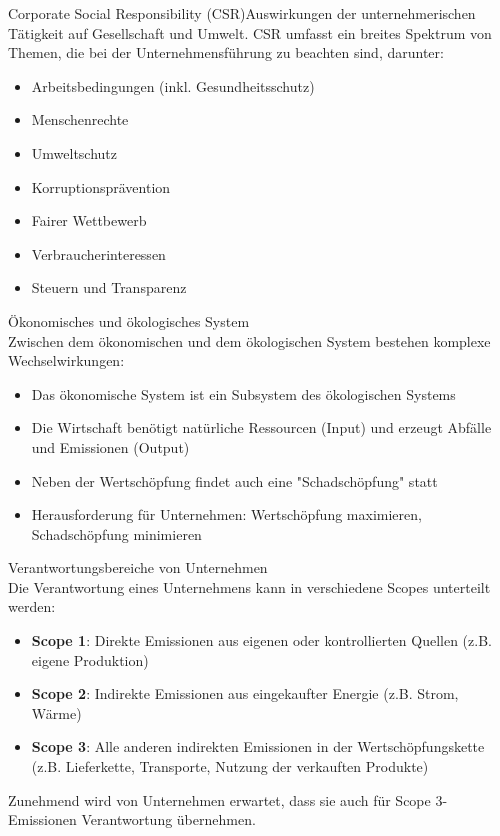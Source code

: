\begin{definition}{Corporate Social Responsibility (CSR)}Auswirkungen der unternehmerischen Tätigkeit auf Gesellschaft und Umwelt. CSR umfasst ein breites Spektrum von Themen, die bei der Unternehmensführung zu beachten sind, darunter:
\begin{itemize}
    \item Arbeitsbedingungen (inkl. Gesundheitsschutz)
    \item Menschenrechte
    \item Umweltschutz
    \item Korruptionsprävention
    \item Fairer Wettbewerb
    \item Verbraucherinteressen
    \item Steuern und Transparenz
\end{itemize}
\end{definition}

\begin{concept}{Ökonomisches und ökologisches System}\\
Zwischen dem ökonomischen und dem ökologischen System bestehen komplexe Wechselwirkungen:
\begin{itemize}
    \item Das ökonomische System ist ein Subsystem des ökologischen Systems
    \item Die Wirtschaft benötigt natürliche Ressourcen (Input) und erzeugt Abfälle und Emissionen (Output)
    \item Neben der Wertschöpfung findet auch eine "Schadschöpfung" statt
    \item Herausforderung für Unternehmen: Wertschöpfung maximieren, Schadschöpfung minimieren
\end{itemize}
\end{concept}

\begin{concept}{Verantwortungsbereiche von Unternehmen}\\
Die Verantwortung eines Unternehmens kann in verschiedene Scopes unterteilt werden:
\begin{itemize}
    \item \textbf{Scope 1}: Direkte Emissionen aus eigenen oder kontrollierten Quellen (z.B. eigene Produktion)
    \item \textbf{Scope 2}: Indirekte Emissionen aus eingekaufter Energie (z.B. Strom, Wärme)
    \item \textbf{Scope 3}: Alle anderen indirekten Emissionen in der Wertschöpfungskette (z.B. Lieferkette, Transporte, Nutzung der verkauften Produkte)
\end{itemize}

Zunehmend wird von Unternehmen erwartet, dass sie auch für Scope 3-Emissionen Verantwortung übernehmen.
\end{concept}

